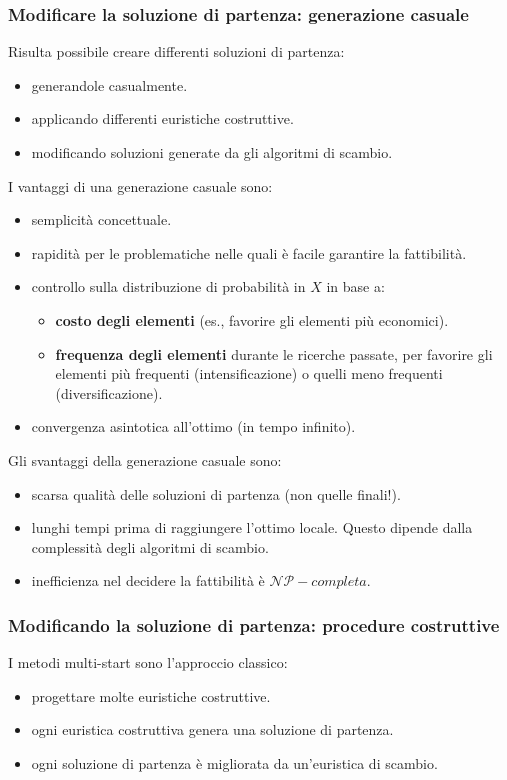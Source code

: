 \documentclass{article}
\begin{document}
\subsubsection{Modificare la soluzione di partenza: generazione casuale}
Risulta possibile creare differenti soluzioni di partenza:
\begin{itemize}
    \item generandole casualmente.
    \item applicando differenti euristiche costruttive.
    \item modificando soluzioni generate da gli algoritmi di scambio.
\end{itemize}
I vantaggi di una generazione casuale sono:
\begin{itemize}
    \item semplicità concettuale.
    \item rapidità per le problematiche nelle quali è facile garantire la fattibilità.
    \item controllo sulla distribuzione di probabilità in $X$ in base a:
    \begin{itemize}
        \item \textbf{costo degli elementi} (es., favorire gli elementi più economici).
        \item \textbf{frequenza degli elementi} durante le ricerche passate, per favorire
        gli elementi più frequenti (intensificazione) o quelli meno frequenti (diversificazione).
    \end{itemize}
    \item convergenza asintotica all'ottimo (in tempo infinito).
\end{itemize}
Gli svantaggi della generazione casuale sono:
\begin{itemize}
    \item scarsa qualità delle soluzioni di partenza (non quelle finali!).
    \item lunghi tempi prima di raggiungere l'ottimo locale. Questo dipende dalla complessità
    degli algoritmi di scambio.
    \item inefficienza nel decidere la fattibilità è $\mathcal{NP}-completa$.
\end{itemize}

\subsubsection{Modificando la soluzione di partenza: procedure costruttive}
I metodi multi-start sono l'approccio classico:
\begin{itemize}
    \item progettare molte euristiche costruttive.
    \item ogni euristica costruttiva genera una soluzione di partenza.
    \item ogni soluzione di partenza è migliorata da un'euristica di scambio.
\end{itemize}
\end{document}
